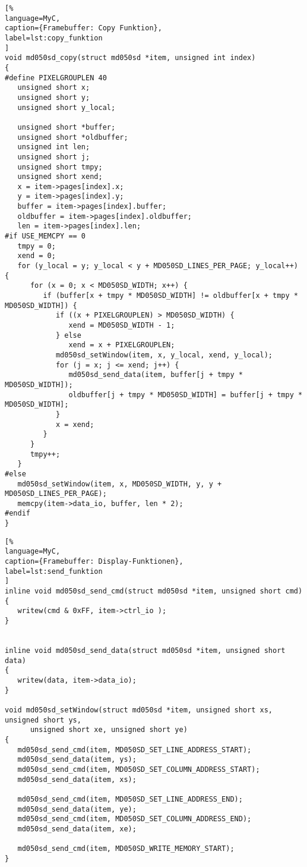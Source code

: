 \begin{lstlisting}[%
language=MyC,
caption={Framebuffer: Copy Funktion},
label=lst:copy_funktion
]
void md050sd_copy(struct md050sd *item, unsigned int index)
{
#define PIXELGROUPLEN 40
   unsigned short x;
   unsigned short y;
   unsigned short y_local;

   unsigned short *buffer;
   unsigned short *oldbuffer;
   unsigned int len;
   unsigned short j;
   unsigned short tmpy;
   unsigned short xend;
   x = item->pages[index].x;
   y = item->pages[index].y;
   buffer = item->pages[index].buffer;
   oldbuffer = item->pages[index].oldbuffer;
   len = item->pages[index].len;
#if USE_MEMCPY == 0
   tmpy = 0;
   xend = 0;
   for (y_local = y; y_local < y + MD050SD_LINES_PER_PAGE; y_local++) {
      for (x = 0; x < MD050SD_WIDTH; x++) {
         if (buffer[x + tmpy * MD050SD_WIDTH] != oldbuffer[x + tmpy * MD050SD_WIDTH]) {
            if ((x + PIXELGROUPLEN) > MD050SD_WIDTH) {
               xend = MD050SD_WIDTH - 1;
            } else
               xend = x + PIXELGROUPLEN;
            md050sd_setWindow(item, x, y_local, xend, y_local);
            for (j = x; j <= xend; j++) {
               md050sd_send_data(item, buffer[j + tmpy * MD050SD_WIDTH]);
               oldbuffer[j + tmpy * MD050SD_WIDTH] = buffer[j + tmpy * MD050SD_WIDTH];
            }
            x = xend;
         }
      }
      tmpy++;
   }
#else
   md050sd_setWindow(item, x, MD050SD_WIDTH, y, y + MD050SD_LINES_PER_PAGE);
   memcpy(item->data_io, buffer, len * 2);
#endif
}
\end{lstlisting}



\begin{lstlisting}[%
language=MyC,
caption={Framebuffer: Display-Funktionen},
label=lst:send_funktion
]
inline void md050sd_send_cmd(struct md050sd *item, unsigned short cmd)
{
   writew(cmd & 0xFF, item->ctrl_io );
}


inline void md050sd_send_data(struct md050sd *item, unsigned short data)
{
   writew(data, item->data_io);
}

void md050sd_setWindow(struct md050sd *item, unsigned short xs, unsigned short ys,
      unsigned short xe, unsigned short ye)
{
   md050sd_send_cmd(item, MD050SD_SET_LINE_ADDRESS_START);
   md050sd_send_data(item, ys);
   md050sd_send_cmd(item, MD050SD_SET_COLUMN_ADDRESS_START);
   md050sd_send_data(item, xs);

   md050sd_send_cmd(item, MD050SD_SET_LINE_ADDRESS_END);
   md050sd_send_data(item, ye);
   md050sd_send_cmd(item, MD050SD_SET_COLUMN_ADDRESS_END);
   md050sd_send_data(item, xe);

   md050sd_send_cmd(item, MD050SD_WRITE_MEMORY_START);
}
\end{lstlisting}


